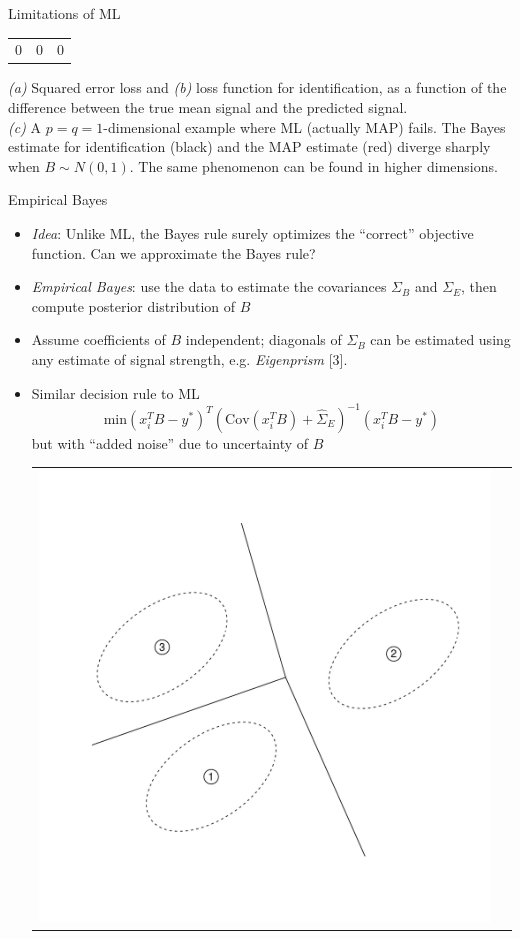 \documentclass[final]{beamer}
\newlength{\onecolwid}
\begin{document}
\begin{frame}[t]
\begin{columns}[t]
\begin{column}{\onecolwid}
\begin{block}{Limitations of ML}
\begin{center}
\begin{tabular}{ccc}
{\small 0} & {\small 0} & {\small 0}\\
\end{tabular}
\end{center}
{\small
\emph{(a)} Squared error loss and \emph{(b)} loss function for identification,
as a function of the difference between the true mean signal and the predicted signal.\\
\emph{(c)} A $p = q = 1$-dimensional example where ML (actually MAP) fails. The Bayes estimate for identification (black) and the MAP estimate (red)
diverge sharply when $B \sim N(0, 1)$.  The same phenomenon can be found in higher dimensions.
}
\end{block}

\begin{block}{Empirical Bayes}

\begin{itemize}
\item \emph{Idea}: Unlike ML, the Bayes rule surely optimizes the ``correct'' objective function.  Can we approximate the Bayes rule?
\item \emph{Empirical Bayes}: use the data to estimate the covariances
$\Sigma_B$ and $\Sigma_E$, then compute posterior distribution of $B$
\item Assume coefficients of $B$ independent; diagonals of $\Sigma_B$ can be estimated using any estimate of signal strength, e.g. \emph{Eigenprism} [3].
\item Similar decision rule to ML
\[
\text{min} (x_i^T B - y^*)^T (\text{Cov}(x_i^T B) + \hat{\Sigma}_E)^{-1} (x_i^T B - y^*)
\]
but with ``added noise'' due to uncertainty of $B$
\begin{center}
\begin{tabular}{cc}
\includegraphics[scale = 0.5, trim = 0in 1.5in 0in 0in]{illus1_A.pdf} & 

\end{tabular}
\end{center}
\end{itemize}
\end{block}
\end{column}
\end{columns}
\end{frame}
\end{document}
